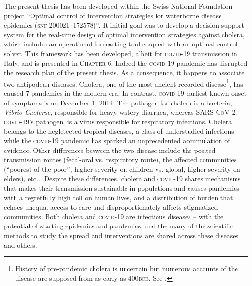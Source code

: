 The present thesis has been developed within the Swiss National Foundation project ``Optimal control of intervention strategies for waterborne disease epidemics (\textsc{snf} 200021–172578)’’. It initial goal was to develop a decision support system for the real-time design of optimal intervention strategies against cholera, which includes an operational forecasting tool coupled with an optimal control solver. This framework has been developed, albeit for \textsc{covid}-19 transmission in Italy, and is presented in \textsc{Chapter 6}. Indeed the \textsc{covid}-19 pandemic has disrupted the research plan of the present thesis. As a consequence, it happens to associate two antipodean diseases. Cholera, one of the most ancient recorded disease\footnote[][10\baselineskip]{History of pre-pandemic cholera is uncertain but numerous accounts of the disease are supposed from as early as 400\textsc{bce}. See .}, has caused 7 pandemics in the modern era. In contrast, \textsc{covid}-19 earliest known onset of symptoms is on December 1, 2019. The pathogen for cholera is a bacteria, \textit{Vibrio Cholerae}, responsible for heavy watery diarrhea, whereas \textsc{SARS-CoV-2}, \textsc{covid}-19’s pathogen, is a virus responsible for respiratory infections. Cholera belongs to the negletected tropical diseases, a class of understudied infections while the \textsc{covid}-19 pandemic has sparked an unprecedented accumulation of evidence. 
Other differences between the two disease include the posited transmission routes (fecal-oral vs. respiratory route), the affected communities (``poorest of the poor”, higher severity on children vs. global, higher severity on elders), etc... Despite these differences, cholera and \textsc{covid}-19 shares mechanisms that makes their transmission sustainable in populations and causes pandemics with a regretfully high toll on human lives, and a distribution of burden that echoes unequal access to care and disproportionately affects stigmatized communities. Both cholera and \textsc{covid}-19 are infectious diseases -- with the potential of starting epidemics and pandemics, and the many of the scientific methods to study the spread and interventions are shared across these diseases and others.


